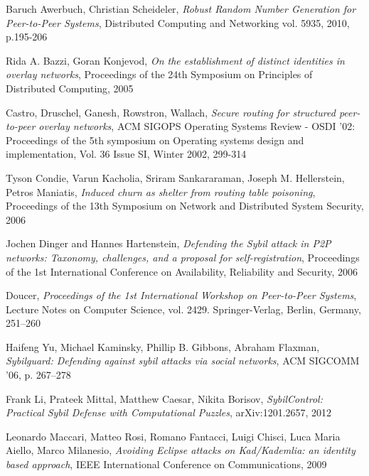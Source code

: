 \begin{thebibliography}{99}

  Baruch Awerbuch, Christian Scheideler,
  \textit{Robust Random Number Generation for Peer-to-Peer Systems},
  Distributed Computing and Networking vol. 5935, 2010, p.195-206

  Rida A. Bazzi, Goran Konjevod,
  \textit{On the establishment of distinct identities in overlay networks},
  Proceedings of the 24th Symposium on Principles of Distributed Computing,
  2005

 Castro, Druschel, Ganesh, Rowstron, Wallach,
  \textit{Secure routing for structured peer-to-peer overlay networks},
  ACM SIGOPS Operating Systems Review - OSDI '02: Proceedings of the 5th
  symposium on Operating systems design and implementation,
  Vol. 36 Issue SI, Winter 2002,
  299-314

  Tyson Condie, Varun Kacholia, Sriram Sankararaman, Joseph M. Hellerstein,
  Petros Maniatis,
  \textit{Induced churn as shelter from routing table poisoning},
  Proceedings of the 13th Symposium on Network and Distributed System Security,
  2006
 
  Jochen Dinger and Hannes Hartenstein,
  \textit{Defending the Sybil attack in P2P networks: Taxonomy, challenges, and
  a proposal for self-registration},
  Proceedings of the 1st International Conference on Availability, Reliability
  and Security,
  2006

 Doucer, \textit{Proceedings of the 1st International
  Workshop on Peer-to-Peer Systems}, Lecture Notes on Computer Science, vol.
  2429.  Springer-Verlag, Berlin, Germany, 251–260

Haifeng Yu, Michael Kaminsky, Phillip B. Gibbons, Abraham Flaxman,
\textit{Sybilguard: Defending against sybil attacks via social networks},
ACM SIGCOMM ’06, p. 267--278

Frank Li, Prateek Mittal, Matthew Caesar, Nikita Borisov,
\textit{SybilControl: Practical Sybil Defense with Computational Puzzles},
arXiv:1201.2657, 2012

  Leonardo Maccari, Matteo Rosi, Romano Fantacci, Luigi Chisci, Luca Maria
  Aiello, Marco Milanesio,
  \textit{Avoiding Eclipse attacks on Kad/Kademlia: an identity based approach},
   IEEE International Conference on Communications, 2009


\end{thebibliography}
